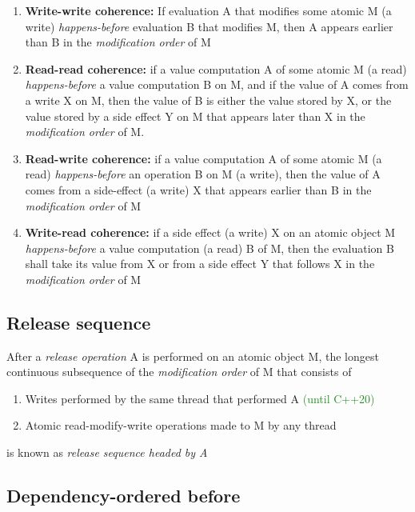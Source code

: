\documentclass[a4paper,12pt,notitlepage,twoside,openright]{article}
\begin{document}
\begin{enumerate}
  \item \textbf{Write-write coherence:} If evaluation A that modifies some atomic M (a write) \emph{happens-before} evaluation B that modifies M, then A appears earlier than B in the \emph{modification order} of M
  \item \textbf{Read-read coherence:} if a value computation A of some atomic M (a read) \emph{happens-before} a value computation B on M, and if the value of A comes from a write X on M, then the value of B is either the value stored by X, or the value stored by a side effect Y on M that appears later than X in the \emph{modification order} of M.
  \item \textbf{Read-write coherence:} if a value computation A of some atomic M (a read) \emph{happens-before} an operation B on M (a write), then the value of A comes from a side-effect (a write) X that appears earlier than B in the \emph{modification order} of M
  \item \textbf{Write-read coherence:} if a side effect (a write) X on an atomic object M \emph{happens-before} a value computation (a read) B of M, then the evaluation B shall take its value from X or from a side effect Y that follows X in the \emph{modification order} of M
\end{enumerate}

\subsection{Release sequence}

After a \emph{release operation} A is performed on an atomic object M, the longest continuous subsequence of the \emph{modification order} of M that consists of

\begin{enumerate}
  \item Writes performed by the same thread that performed A \textcolor{ForestGreen}{(until C++20)}
  \item Atomic read-modify-write operations made to M by any thread
\end{enumerate}

is known as \emph{release sequence headed by A}

\hypertarget{dependency-ordered-before}{%
\subsection{Dependency-ordered before}\label{dependency-ordered-before}}
\end{document}
